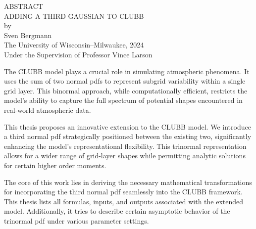 \begin{center}
    ABSTRACT
    \\
    \singlespacing
    ADDING A THIRD GAUSSIAN TO CLUBB\\
    \doublespacing
    by\\
    Sven Bergmann\\
    \singlespacing
    The University of Wisconsin--Milwaukee, 2024\\
    Under the Supervision of Professor Vince Larson
\end{center}

The \gls{CLUBB} model plays a crucial role in simulating atmospheric phenomena.
It uses the sum of two normal \glspl{pdf} to represent subgrid variability within a single grid layer.
This binormal approach, while computationally efficient,
restricts the model's ability to capture the full spectrum of potential shapes encountered in real-world atmospheric data.

This thesis proposes an innovative extension to the \gls{CLUBB} model.
We introduce a third normal \gls{pdf} strategically positioned between the existing two,
significantly enhancing the model's representational flexibility.
This trinormal representation allows for a wider range of grid-layer shapes
while permitting analytic solutions for certain higher order moments.

The core of this work lies in deriving the necessary mathematical transformations
for incorporating the third normal \gls{pdf} seamlessly into the \gls{CLUBB} framework.
This thesis lists all formulas, inputs, and outputs associated with the extended model.
Additionally,
it tries to describe certain asymptotic behavior of the trinormal \gls{pdf}
under various parameter settings.
